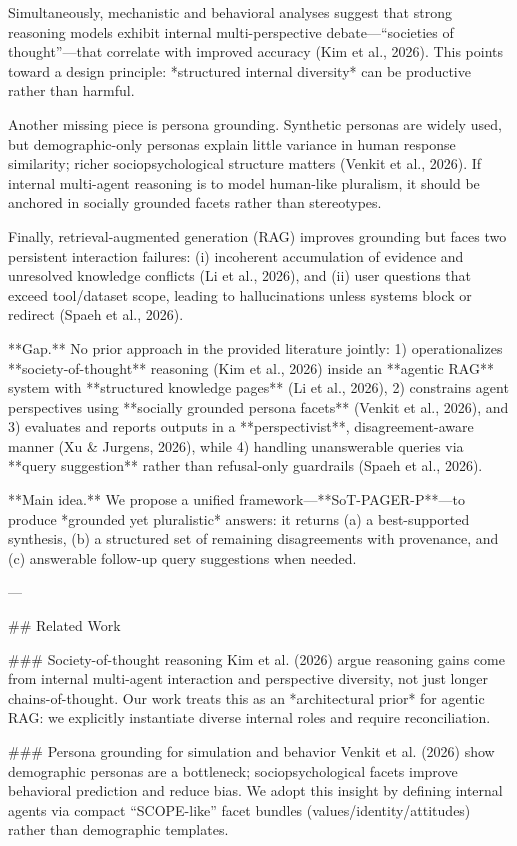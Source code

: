 Simultaneously, mechanistic and behavioral analyses suggest that strong reasoning models exhibit internal multi-perspective debate—“societies of thought”—that correlate with improved accuracy (Kim et al., 2026). This points toward a design principle: *structured internal diversity* can be productive rather than harmful.  

Another missing piece is persona grounding. Synthetic personas are widely used, but demographic-only personas explain little variance in human response similarity; richer sociopsychological structure matters (Venkit et al., 2026). If internal multi-agent reasoning is to model human-like pluralism, it should be anchored in socially grounded facets rather than stereotypes.  

Finally, retrieval-augmented generation (RAG) improves grounding but faces two persistent interaction failures: (i) incoherent accumulation of evidence and unresolved knowledge conflicts (Li et al., 2026), and (ii) user questions that exceed tool/dataset scope, leading to hallucinations unless systems block or redirect (Spaeh et al., 2026).  

**Gap.** No prior approach in the provided literature jointly:  
1) operationalizes **society-of-thought** reasoning (Kim et al., 2026) inside an **agentic RAG** system with **structured knowledge pages** (Li et al., 2026),  
2) constrains agent perspectives using **socially grounded persona facets** (Venkit et al., 2026), and  
3) evaluates and reports outputs in a **perspectivist**, disagreement-aware manner (Xu & Jurgens, 2026), while  
4) handling unanswerable queries via **query suggestion** rather than refusal-only guardrails (Spaeh et al., 2026).  

**Main idea.** We propose a unified framework—**SoT-PAGER-P**—to produce *grounded yet pluralistic* answers: it returns (a) a best-supported synthesis, (b) a structured set of remaining disagreements with provenance, and (c) answerable follow-up query suggestions when needed.

---

## Related Work  

### Society-of-thought reasoning  
Kim et al. (2026) argue reasoning gains come from internal multi-agent interaction and perspective diversity, not just longer chains-of-thought. Our work treats this as an *architectural prior* for agentic RAG: we explicitly instantiate diverse internal roles and require reconciliation.

### Persona grounding for simulation and behavior  
Venkit et al. (2026) show demographic personas are a bottleneck; sociopsychological facets improve behavioral prediction and reduce bias. We adopt this insight by defining internal agents via compact “SCOPE-like” facet bundles (values/identity/attitudes) rather than demographic templates.

